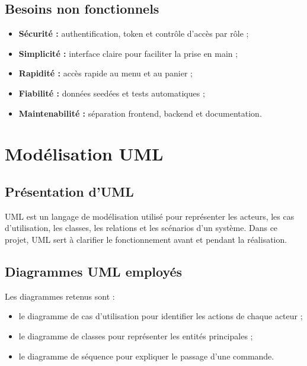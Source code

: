 \documentclass[12pt,a4paper]{report}
\begin{document}
\section{Besoins non fonctionnels}
\begin{itemize}
  \item \textbf{Sécurité :} authentification, token et contrôle d'accès par rôle ;
  \item \textbf{Simplicité :} interface claire pour faciliter la prise en main ;
  \item \textbf{Rapidité :} accès rapide au menu et au panier ;
  \item \textbf{Fiabilité :} données seedées et tests automatiques ;
  \item \textbf{Maintenabilité :} séparation frontend, backend et documentation.
\end{itemize}

\chapter{Modélisation UML}
\section{Présentation d'UML}
UML est un langage de modélisation utilisé pour représenter les acteurs, les cas d'utilisation, les classes, les relations et les scénarios d'un système. Dans ce projet, UML sert à clarifier le fonctionnement avant et pendant la réalisation.

\section{Diagrammes UML employés}
Les diagrammes retenus sont :
\begin{itemize}
  \item le diagramme de cas d'utilisation pour identifier les actions de chaque acteur ;
  \item le diagramme de classes pour représenter les entités principales ;
  \item le diagramme de séquence pour expliquer le passage d'une commande.
\end{itemize}
\end{document}
